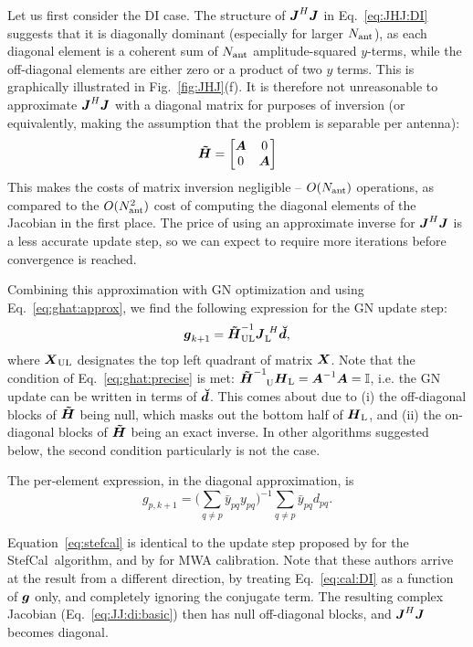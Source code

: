\documentclass[useAMS,usenatbib]{mn2e}
\makeatletter
\newcommand{\II}{\mathbb{I}}
\newcommand{\vecg}{\bmath{g}}
\newcommand{\mat}[1]{{\bmath{#1}}}
\newcommand{\JJ}{\mat{J}} %
\newcommand{\HH}{\mat{H}} %
\newcommand{\HHa}{\mat{\tilde{H}}} %
\newcommand{\JHJ}{\JJ^H\JJ} %
\newcommand{\Matrix}[2]{\left [ \begin{array}{@{}#1@{}}#2\end{array} \right ]}
\newcommand{\AUG}[1]{\bmath{\breve{#1}}}
\newcommand{\Dd}{\AUG{d}}
\newcommand{\TOP}{\mathrm{U}}%
\newcommand{\LEFT}{\mathrm{L}}
\newcommand{\UL}{\mathrm{UL}}%
\newcommand{\StefCal}{{\sc StefCal}}
\numberwithin{equation}{section} %
\makeatother
\begin{document}
Let us first consider the DI case. The structure of $\JJ^H\JJ$ in Eq.~\ref{eq:JHJ:DI} suggests that it is diagonally 
dominant (especially for larger $N_\mathrm{ant}$), as each diagonal element is a coherent sum of $N_\mathrm{ant}$ amplitude-squared $y$-terms, 
while the off-diagonal elements are either zero or a product of two $y$ terms. This is graphically illustrated in 
Fig.~\ref{fig:JHJ}(f). It is therefore not unreasonable 
to approximate $\JHJ$ with a diagonal matrix for purposes of inversion (or equivalently, making the assumption that 
the problem is separable per antenna):
\begin{equation}
\HHa = \Matrix{cc}{\bmath{A}&0\\0&\bmath{A}}
\end{equation}
This makes the costs of matrix inversion negligible -- $O(N_\mathrm{ant})$ operations, as compared to the $O(N_\mathrm{ant}^2)$ cost 
of computing the diagonal elements of the Jacobian in the first place. The price of using an approximate inverse for 
$\JHJ$ is a less accurate update step, so we can expect to require more iterations before convergence is reached.

Combining this approximation with GN optimization and using Eq.~\ref{eq:ghat:approx}, we find the following expression
for the GN update step:
\begin{equation}
\label{eq:stefcal-matrix}
\vecg_{k+1} = \HHa^{-1}_{\UL} \JJ_\LEFT^{~H} \Dd,
\end{equation}
where $\bmath{X}_\UL$ designates the top left quadrant of matrix $\bmath{X}$. Note that the condition of 
Eq.~\ref{eq:ghat:precise} is met: $\HHa^{-1}_{~~~\TOP} \HH_\LEFT=\bmath{A}^{-1}\bmath{A}=\II$, i.e. the
GN update can be written in terms of $\Dd$. This comes about due to
(i) the off-diagonal blocks of $\HHa$ being null, which masks out the bottom half of $\HH_\LEFT$, and 
(ii) the on-diagonal blocks of $\HHa$ being an exact inverse. In other algorithms suggested below, the second
condition particularly is not the case.

The per-element expression, in the diagonal approximation, is
\begin{equation}
\label{eq:stefcal}
g_{p,k+1} = \big( \sum\limits_{q\ne p} \bar{y}_{pq} y_{pq} \big)^{-1} \sum\limits_{q\ne p} \bar{y}_{pq} d_{pq}.
\end{equation}

Equation~\ref{eq:stefcal} 
is identical to the update step proposed by \citet{Stefcal} for the \StefCal\ algorithm, and by 
\citet{Mitchell-RTS} for MWA calibration. Note that these authors arrive at the result from a different 
direction, by treating Eq.~\ref{eq:cal:DI} as a function of $\bmath{g}$ only, and completely ignoring 
the conjugate term. 
The resulting complex Jacobian (Eq.~\ref{eq:JJ:di:basic}) then has null off-diagonal blocks, and $\JJ^H\JJ$ becomes 
diagonal.
\end{document}
